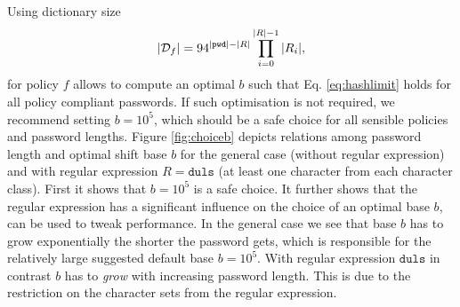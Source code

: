 Using dictionary size 
\[|\mathcal{D}_f|=94^{|\mathtt{pwd}|-|R|}\prod_{i=0}^{|R|-1}|R_i|,\]
for policy $f$ allows to compute an optimal $b$ such that Eq. \ref{eq:hashlimit} holds for all policy compliant passwords.
If such optimisation is not required, we recommend setting $b=10^5$, which should be a safe choice for all sensible policies and password lengths.
Figure \ref{fig:choiceb} depicts relations among password length and optimal shift base $b$ for the general case (without regular expression) and with regular expression $R=\mathtt{duls}$ (\ie at least one character from each character class).
First it shows that $b=10^5$ is a safe choice.
It further shows that the regular expression has a significant influence on the choice of an optimal base $b$, \ie can be used to tweak performance.
In the general case we see that base $b$ has to grow exponentially the shorter the password gets, which is responsible for the relatively large suggested default base $b=10^5$.
With regular expression $\mathtt{duls}$ in contrast $b$ has to \emph{grow} with increasing password length.
This is due to the restriction on the character sets from the regular expression.


